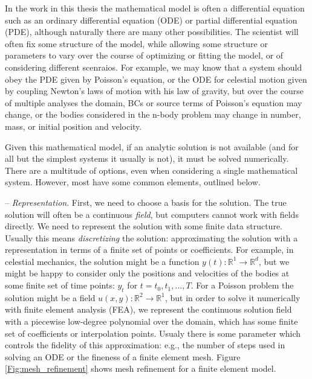 \documentclass{puthesis}
\begin{document}
In the work in this thesis the mathematical model is often a differential equation
such as an ordinary differential equation (ODE) or partial differential equation
(PDE), although naturally there are many other possibilities. The scientist will often
fix some structure of the model, while allowing some structure or parameters to vary
over the course of optimizing or fitting the model, or of considering different
scenraios. For example, we may know that a system should obey the PDE
given by Poisson's equation, or the ODE for celestial motion given by coupling Newton's
laws of motion with his law of gravity, but over the course of multiple analyses the
domain, BCs or source terms of Poisson's equation may change,
or the bodies considered in the n-body problem may
change in number, mass, or initial position and velocity.

Given this mathematical model, if an analytic solution is not available
(and for all but the simplest systems it usually is not),
it must be solved numerically. There are a multitude of options, even when considering
a single mathematical system. However, most have some common elements, outlined below.


-- \emph{Representation}. First, we need to choose a basis for the solution.
The true solution will often be a
continuous \emph{field}, but computers cannot work with fields directly. We need to
represent the solution with some finite data structure. Usually this means
\emph{discretizing} the solution: approximating the solution with a representation in
terms of a finite set of points or coefficients. For example, in celestial mechanics,
the solution might be a function $y(t): \mathbb{R}^1 \to \mathbb{R}^d$, but we might be happy
to consider only the positions and velocities of the bodies at some finite set of
time points: $y_t$ for $t = t_0, t_1, ..., T$. For a Poisson problem the solution
might be a field $u(x, y): \mathbb{R}^2 \to \mathbb{R}^1$, but in order to solve it
numerically with finite element analysis (FEA), we represent the continuous solution
field with a piecewise low-degree polynomial over the domain, which has some finite
set of coefficients or interpolation points.
Usualy there is some parameter which controls the fidelity of this approximation: e.g.,
the number of steps used in solving an ODE or the fineness of a finite element mesh.
Figure \ref{Fig:mesh_refinement} shows mesh refinement for a finite element model.
\end{document}
